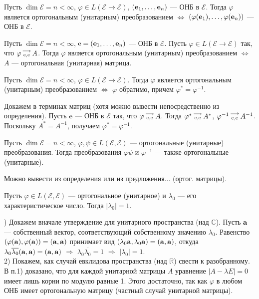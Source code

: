 \begin{sled1}
Пусть $\dim \mathcal{E}=n<\infty $, $\varphi \in L(\mathcal{E}\to \mathcal{E})$, 
$(\mathbf{e}_1, \ldots, \mathbf{e}_n)$ --- ОНБ в $\mathcal{E}$.
Тогда $\varphi$ является ортогональным  (унитарным) преобразованием $\Leftrightarrow$ $(\varphi(\mathbf{e}_1), \ldots, \varphi(\mathbf{e}_n))$ --- ОНБ в $\mathcal{E}$. 
\end{sled1}


\begin{sled2}
Пусть $\dim \mathcal{E}=n<\infty $, $\mathrm{e}=(\mathbf{e}_1, \ldots, \mathbf{e}_n)$ --- ОНБ в $\mathcal{E}$.
Пусть $\varphi \in L(\mathcal{E}\to \mathcal{E})$ так, что 
$\varphi \begin{smallmatrix} \longrightarrow \\ \mathrm{e}, \mathrm{e} \end{smallmatrix} A$.
Тогда $\varphi$ является ортогональным  (унитарным) преобразованием $\Leftrightarrow$ $A$ --- ортогональная (унитарная) матрица.
\end{sled2}

\begin{sled3}
Пусть $\dim \mathcal{E}=n<\infty $, $\varphi \in L(\mathcal{E}\to \mathcal{E})$.
Тогда $\varphi$ является ортогональным  (унитарным) преобразованием $\Leftrightarrow$ $\varphi$ обратимо, причем $\varphi ^{*} = \varphi ^{-1}$. 
\end{sled3}
\dok
Докажем в терминах матриц (хотя можно вывести непосредственно из определения).
Пусть $\mathrm{e}$ --- ОНБ в $\mathcal{E}$ так, что 
$\varphi \begin{smallmatrix} \longrightarrow \\ \mathrm{e}, \mathrm{e} \end{smallmatrix} A$. Тогда $\varphi^{*} \begin{smallmatrix} \longrightarrow \\ \mathrm{e}, \mathrm{e} \end{smallmatrix} A^{*}$, 
$\varphi^{-1} \begin{smallmatrix} \longrightarrow \\ \mathrm{e}, \mathrm{e} \end{smallmatrix} A^{-1}$. Поскольку $A^{*}=A^{-1}$, получаем $\varphi^{*}=\varphi^{-1}$.
\edok


\begin{predl}\label{p10_5_2} 
Пусть $\dim \mathcal{E}=n<\infty $, $\varphi, \psi \in L(\mathcal{E}, \mathcal{E})$ --- ортогональные (унитарные) преобразования.
Тогда преобразования $\varphi \psi$ и $\varphi ^{-1}$ --- также ортогональные (унитарные).
\end{predl}
\dok Можно вывести из определения или из предложения... (ортог. матрицы).
\edok


\begin{predl}\label{p10_5_3} 
Пусть $\varphi \in L(\mathcal{E}, \mathcal{E})$ --- ортогональное (унитарное) и $\lambda_0$ --- его характеристическое число.
Тогда $|\lambda_0|=1$.
\end{predl}
) Докажем вначале утверждение для унитарного пространства (над $\mathbb{C}$). Пусть $\mathbf{a}$ --- собственный вектор, 
соответствующий собственному значению $\lambda_0$.
Равенство $(\varphi(\mathbf{a}), \varphi(\mathbf{a})) = (\mathbf{a}, \mathbf{a})$
принимает вид $(\lambda_0 \mathbf{a}, \lambda_0 \mathbf{a}) = (\mathbf{a}, \mathbf{a})$, откуда 
$\lambda_0 \overline{\lambda_0}  (\mathbf{a}, \mathbf{a}) = (\mathbf{a},  \mathbf{a})$ $\Rightarrow$ $\lambda_0 \overline{\lambda_0}=1$ $\Rightarrow$ $|\lambda_0|=1$.\\
2) Покажем, как случай евклидова пространства (над $\mathbb{R}$) свести к разобранному. В п.1) доказано, что 
для каждой унитарной матрицы $A$ уравнение $|A-\lambda E|=0$ имеет лишь корни по модулю равные 1. Этого достаточно, так как  $\varphi$ в любом ОНБ имеет 
ортогональную матрицу (частный случай унитарной матрицы).
\edok


